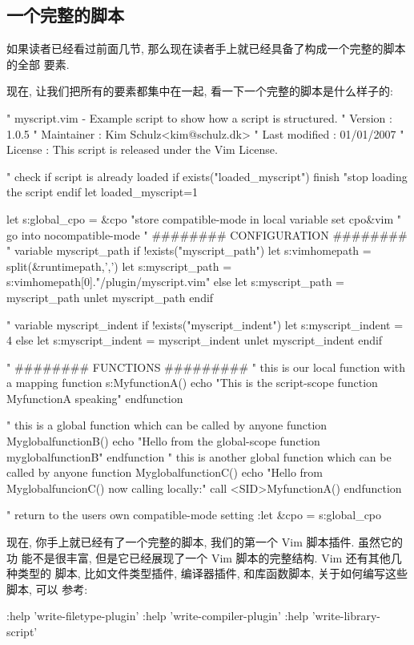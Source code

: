 \subsection{一个完整的脚本}
\label{subsec:putting_it_all_together}

如果读者已经看过前面几节, 那么现在读者手上就已经具备了构成一个完整的脚本的全部
要素.

现在, 让我们把所有的要素都集中在一起, 看一下一个完整的脚本是什么样子的:
\begin{vimcode}
" myscript.vim  - Example script to show how a script is structured.
" Version       : 1.0.5
" Maintainer    : Kim Schulz<kim@schulz.dk>
" Last modified : 01/01/2007
" License       : This script is released under the Vim License.

" check if script is already loaded
if exists("loaded_myscript")
	finish "stop loading the script
endif
let loaded_myscript=1
\end{vimcode}
\begin{vimcode}

	let s:global_cpo = &cpo  "store compatible-mode in local variable
	set cpo&vim              " go into nocompatible-mode
" ######## CONFIGURATION ########
" variable myscript_path
if !exists("myscript_path")
	let s:vimhomepath = split(&runtimepath,',')
	let s:myscript_path = s:vimhomepath[0]."/plugin/myscript.vim"
else
	let s:myscript_path = myscript_path
	unlet myscript_path
endif

" variable myscript_indent
if !exists("myscript_indent")
	let s:myscript_indent = 4
else
	let s:myscript_indent = myscript_indent
	unlet myscript_indent
endif

	" ######## FUNCTIONS #########
	" this is our local function with a mapping
function s:MyfunctionA()
	echo "This is the script-scope function MyfunctionA speaking"
endfunction

" this is a global function which can be called by anyone
function MyglobalfunctionB()
	echo "Hello from the global-scope function myglobalfunctionB"
endfunction
" this is another global function which can be called by anyone
function MyglobalfunctionC()
	echo "Hello from MyglobalfuncionC() now calling locally:"
	call <SID>MyfunctionA()
endfunction

" return to the users own compatible-mode setting
:let &cpo = s:global_cpo
\end{vimcode}
现在, 你手上就已经有了一个完整的脚本, 我们的第一个 Vim 脚本插件.  虽然它的功
能不是很丰富, 但是它已经展现了一个 Vim 脚本的完整结构. Vim 还有其他几种类型的
脚本, 比如文件类型插件, 编译器插件, 和库函数脚本, 关于如何编写这些脚本, 可以
参考:
\begin{vimcode}
:help 'write-filetype-plugin'
:help 'write-compiler-plugin'
:help 'write-library-script'
\end{vimcode}

